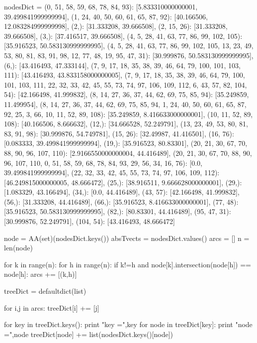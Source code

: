 nodesDict = {
(0, 51, 58, 59, 68, 78, 84, 93): [5.833310000000001, 39.499841999999994],
 (1, 24, 40, 50, 60, 61, 65, 87, 92): [40.166506, 12.083284999999998],
 (2,): [31.333208, 39.666508],
 (2, 15, 26): [31.333208, 39.666508],
 (3,): [37.416517, 39.666508],
 (4, 5, 28, 41, 63, 77, 86, 99, 102, 105): [35.916523, 50.583130999999995],
 (4, 5, 28, 41, 63, 77, 86, 99, 102, 105, 13, 23, 49, 53, 80, 81, 83, 91, 98, 12, 77, 48, 19, 95, 47, 31): [30.999876, 50.583130999999995],
 (6,): [43.416493, 47.333144],
 (7, 9, 17, 18, 35, 38, 39, 46, 64, 79, 100, 101, 103, 111): [43.416493, 43.833158000000005],
 (7, 9, 17, 18, 35, 38, 39, 46, 64, 79, 100, 101, 103, 111, 22, 32, 33, 42, 45, 55, 73, 74, 97, 106, 109, 112, 6, 43, 57, 82, 104, 54): [42.166498, 41.999832],
 (8, 14, 27, 36, 37, 44, 62, 69, 75, 85, 94): [35.249859, 11.499954],
 (8, 14, 27, 36, 37, 44, 62, 69, 75, 85, 94, 1, 24, 40, 50, 60, 61, 65, 87, 92, 25, 3, 66, 10, 11, 52, 89, 108): [35.249859, 8.416633000000001],
 (10, 11, 52, 89, 108): [40.166506, 8.666632],
 (12,): [34.666528, 52.249791],
 (13, 23, 49, 53, 80, 81, 83, 91, 98): [30.999876, 54.749781],
 (15, 26): [32.49987, 41.416501],
 (16, 76): [0.083333, 39.499841999999994],
 (19,): [35.916523, 80.83301],
 (20, 21, 30, 67, 70, 88, 90, 96, 107, 110): [2.9166550000000004, 44.416489],
 (20, 21, 30, 67, 70, 88, 90, 96, 107, 110, 0, 51, 58, 59, 68, 78, 84, 93, 29, 56, 34, 16, 76): [0.0, 39.499841999999994],
 (22, 32, 33, 42, 45, 55, 73, 74, 97, 106, 109, 112): [46.249815000000005, 48.666472],
 (25,): [38.916511, 9.666628000000001],
 (29,): [1.083329, 43.166494],
 (34,): [0.0, 44.416489],
 (43, 57): [42.166498, 41.999832],
 (56,): [31.333208, 44.416489],
 (66,): [35.916523, 8.416633000000001],
 (77, 48): [35.916523, 50.583130999999995],
 (82,): [80.83301, 44.416489],
 (95, 47, 31): [30.999876, 52.249791],
 (104, 54): [43.416493, 48.666472]
 }



node = AA(set)(nodesDict.keys())
absTvects = nodesDict.values()
arcs = []
n = len(node)

for k in range(n):
	for h in range(n):
		if k!=h and node[k].intersection(node[h]) == node[h]:
			arcs += [(k,h)]
	
	
	
treeDict = defaultdict(list)

for i,j in arcs:
	treeDict[i] += [j]
	
for key in treeDict.keys():
	print "key =",key
	for node in treeDict[key]:
		print "node =",node
		treeDict[node] += list(nodesDict.keys()[node])
	


